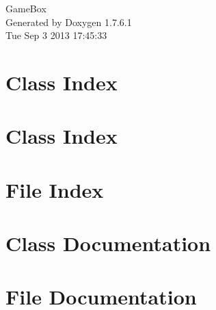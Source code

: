 \documentclass[a4paper]{book}
\begin{document}
\hypersetup{pageanchor=false,citecolor=blue}
\begin{titlepage}
\vspace*{7cm}
\begin{center}
{\Large \-Game\-Box }\\
\vspace*{1cm}
{\large \-Generated by Doxygen 1.7.6.1}\\
\vspace*{0.5cm}
{\small Tue Sep 3 2013 17:45:33}\\
\end{center}
\end{titlepage}
\clearemptydoublepage
{}
\tableofcontents
\clearemptydoublepage
{}
\hypersetup{pageanchor=true,citecolor=blue}
\chapter{\-Class \-Index}

\chapter{\-Class \-Index}

\chapter{\-File \-Index}

\chapter{\-Class \-Documentation}



















\chapter{\-File \-Documentation}





















\printindex
\end{document}
